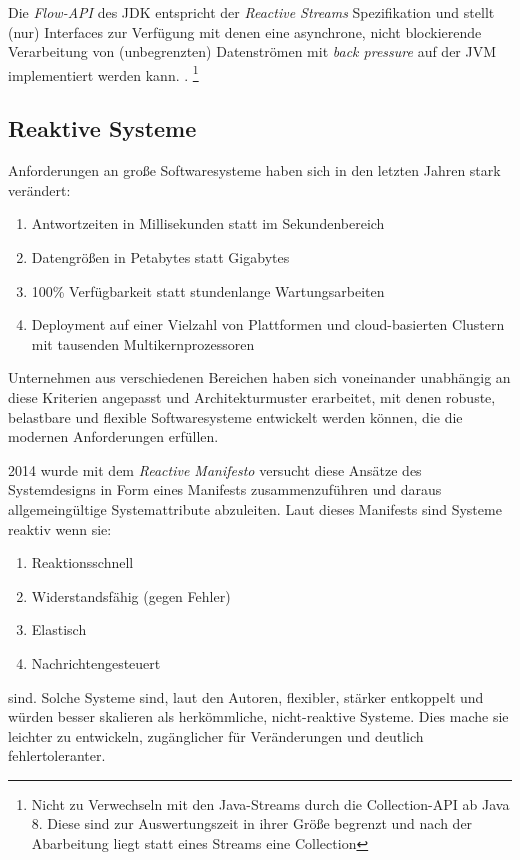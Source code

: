 Die \textit{Flow-API} des JDK entspricht der \textit{Reactive Streams} Spezifikation und stellt (nur) Interfaces zur Verfügung mit denen eine
asynchrone, nicht blockierende Verarbeitung von (unbegrenzten) Datenströmen mit \textit{back pressure} auf der JVM implementiert werden kann.
\parencite{OracleFlow}.
\footnote{Nicht zu Verwechseln mit den Java-Streams durch die Collection-API ab Java 8. Diese sind zur Auswertungszeit in ihrer Größe begrenzt und
    nach der Abarbeitung liegt statt eines Streams eine Collection}

\subsection{Reaktive Systeme}
\label{section:reaktive_systeme}
Anforderungen an große Softwaresysteme haben sich in den letzten Jahren stark verändert:
\begin{enumerate}
    \item Antwortzeiten in Millisekunden statt im Sekundenbereich
    \item Datengrößen in Petabytes statt Gigabytes
    \item 100\% Verfügbarkeit statt stundenlange Wartungsarbeiten
    \item Deployment auf einer Vielzahl von Plattformen und cloud-basierten Clustern mit tausenden Multikernprozessoren
\end{enumerate}

Unternehmen aus verschiedenen Bereichen haben sich voneinander unabhängig an diese Kriterien angepasst und Architekturmuster
erarbeitet, mit denen robuste, belastbare und flexible Softwaresysteme entwickelt werden können, die die modernen Anforderungen
erfüllen.

2014 wurde mit dem \textit{Reactive Manifesto} versucht diese Ansätze des Systemdesigns in Form eines Manifests zusammenzuführen
und daraus allgemeingültige Systemattribute abzuleiten.
Laut dieses Manifests sind Systeme reaktiv wenn sie:
\begin{enumerate}
    \item Reaktionsschnell
    \item Widerstandsfähig (gegen Fehler)
    \item Elastisch
    \item Nachrichtengesteuert
\end{enumerate}
sind.
Solche Systeme sind, laut den Autoren, flexibler, stärker entkoppelt und würden besser skalieren als herkömmliche, nicht-reaktive Systeme.
Dies mache sie leichter zu entwickeln, zugänglicher für Veränderungen und deutlich fehlertoleranter.

